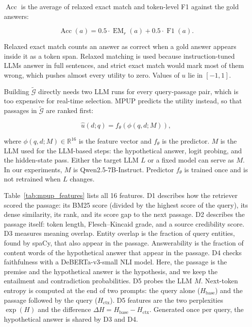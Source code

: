 \documentclass[conference]{IEEEtran}
\begin{document}
$\operatorname{Acc}$ is the average of relaxed exact match and
token-level F1 against the gold answers:

\begin{equation}
    \operatorname{Acc}(a)
    =
    0.5 \cdot \operatorname{EM}_r(a)
    +
    0.5 \cdot \operatorname{F1}(a).
    \label{eq:acc}
\end{equation}

Relaxed exact match counts an answer as correct when a gold answer
appears inside it as a token span. Relaxed matching is used because instruction-tuned
LLMs answer in full sentences, and strict exact match would mark most
of them wrong, which pushes almost every utility to zero. Values of $u$ lie in $[-1,1]$.

Building $\widetilde{\mathcal{G}}$ directly needs two LLM runs for
every query-passage pair, which is too expensive for real-time
selection. MPUP predicts the utility instead, so that passages in
$\widetilde{\mathcal{G}}$ are ranked first:

\begin{equation}
    \hat{u}(d;q)
    =
    f_{\theta}(\phi(q,d;M)),
    \label{eq:pred}
\end{equation}

where $\phi(q,d;M)\in\mathbb{R}^{16}$ is the feature vector and
$f_{\theta}$ is the predictor. $M$ is the LLM used for the
LLM-based steps: the hypothetical answer, logit probing, and the hidden-state pass. Either the target LLM $L$ or a fixed model can serve as $M$. In our experiments, $M$ is
Qwen2.5-7B-Instruct. Predictor $f_{\theta}$ is trained once and is not retrained when $L$ changes.

Table~\ref{tab:mpup_features} lists all 16 features. D1 describes how the retriever
scored the passage: its BM25 score (divided by the highest score of
the query), its dense similarity, its rank, and its score gap to the
next passage. D2 describes the passage itself: token length,
Flesch--Kincaid grade, and a source credibility score. D3 measures
meaning overlap. Entity overlap is the fraction of query entities,
found by spaCy, that also appear in the passage. Answerability is the
fraction of content words of the hypothetical answer that appear in
the passage. D4 checks faithfulness with a DeBERTa-v3-small NLI model.
Here, the passage is the premise and the hypothetical answer is the hypothesis, and we keep the entailment and contradiction probabilities.
D5 probes the LLM $M$. Next-token entropy is computed at the end of two prompts: the query alone
($H_{\text{base}}$) and the passage followed by the query
($H_{\text{ctx}}$). D5 features are the two perplexities $\exp(H)$
and the difference
$\Delta H = H_{\text{base}} - H_{\text{ctx}}$. Generated once per query, the hypothetical answer is shared by D3 and D4.
\end{document}
